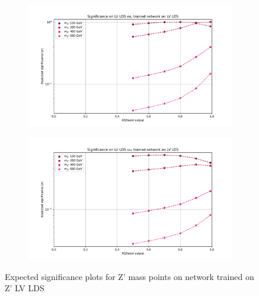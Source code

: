 \documentclass[12pt, a4paper]{book}
\begin{document}
\begin{figure}[!ht]
	\centering
	\begin{subfigure}[b]{0.49\textwidth}
      \centering
      \includegraphics[width=1\textwidth]{XGBoost/LV_LDS/EXP_SIG_ee.pdf}
      \end{subfigure}
   \hfill
   \begin{subfigure}[b]{0.49\textwidth}
      \centering
      \includegraphics[width=1\textwidth]{XGBoost/LV_LDS/EXP_SIG_uu.pdf}
      \end{subfigure}
   \caption{Expected significance plots for Z' mass points on network trained on Z' LV LDS}\label{fig:LV_LDS_exp_sig}
\end{figure}
\end{document}
